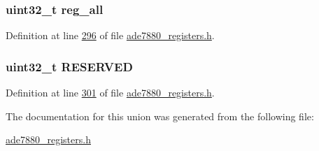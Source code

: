 \hypertarget{a00028_ae44a0232a79ff51b5ef7aa80e4b35470}{
\subsubsection[{reg\-\_\-all}]{\setlength{\rightskip}{0pt plus 5cm}uint32\-\_\-t reg\-\_\-all}}\label{dc/d3c/a00028_ae44a0232a79ff51b5ef7aa80e4b35470}


Definition at line \hyperlink{a00036_source_l00296}{296} of file \hyperlink{a00036_source}{ade7880\-\_\-registers.\-h}.

\hypertarget{a00028_a0e5030971ec1bfd3101f83f546493c83}{
\subsubsection[{R\-E\-S\-E\-R\-V\-E\-D}]{\setlength{\rightskip}{0pt plus 5cm}uint32\-\_\-t R\-E\-S\-E\-R\-V\-E\-D}}\label{dc/d3c/a00028_a0e5030971ec1bfd3101f83f546493c83}


Definition at line \hyperlink{a00036_source_l00301}{301} of file \hyperlink{a00036_source}{ade7880\-\_\-registers.\-h}.



The documentation for this union was generated from the following file\-:\begin{DoxyCompactItemize}
\item 
\hyperlink{a00036}{ade7880\-\_\-registers.\-h}\end{DoxyCompactItemize}
